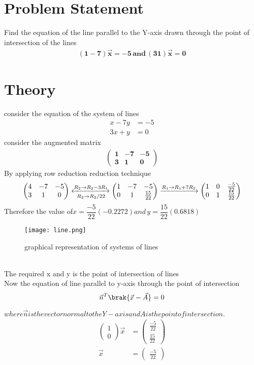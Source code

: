 \documentclass{article}
\newcommand{\myvec}[1]{\ensuremath{\begin{pmatrix}#1\end{pmatrix}}}
\begin{document}
\section{Problem Statement}
Find the equation of the line parallel to the Y-axis drawn through the point of intersection of the lines
\begin{align}
\mathbf{{(1 -7)\vec{x}=-5 \, and \, (3 1)\vec{x}=0}}
\end{align}
\section{Theory}
consider the equation of the system of lines
\begin{align}
x - 7y & = -5 \\
3x + y & = 0
\end{align}
 consider the augmented matrix
 \begin{align}
 \boldsymbol{{\myvec{1 & -7 & -5 \\ 3 & 1 & 0}}}
 \end{align}
 By applying row reduction reduction technique \\
 \begin{align}
\myvec{4 & -7 & -5\\ 3 & 1 & 0}
	\xleftrightarrow[R_2 \rightarrow R_2/22]{R_2 \rightarrow R_2-3R_1}
	\myvec{1 & -7 & -5 \\ 0 & 1 & \frac{15}{22}}
	\xrightarrow[]{R_1 \rightarrow R_1+7R_2}
	 \myvec{1 & 0 & \frac{-5}{22} \\ 0 & 1 & \frac{15}{22}}
 \end{align}
Therefore the value of$ x = \dfrac{-5}{22}(-0.2272) and \, y = \dfrac{15}{22}(0.6818)$ \\
 \begin{figure}
 \centering
 \texttt{[image: line.png]}
 \caption{graphical representation of systems of lines}
 \end{figure}
 \\
The required x and y is the point of intersection of lines\\ 
Now the equation of line parallel to y-axis through the point of intersection\\
\begin{align}
  \vec{n}^T\brak{\vec{x}-\vec{A}} = 0 
\end{align}

$where \vec{n}  is the vector normal to the Y - axis and A is the point of intersection.$
\begin{align}
 \myvec{1 \\ 0}\vec{x} & = \myvec{ \frac{-5}{22}\\ \frac{15}{22}} \\
\vec{x} & = \myvec{\frac{-5}{22}} 
 \end{align}
  
\end{document}
